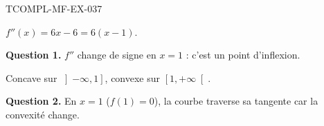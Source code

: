 \begin{corrige}{TCOMPL-MF-EX-037}

$f''(x) = 6x - 6 = 6(x-1)$.


\textbf{Question 1.} $f''$ change de signe en $x = 1$ : c'est un point d'inflexion.

Concave sur $\left]-\infty, 1\right]$, convexe sur $\left[1, +\infty\right[$.

\textbf{Question 2.} En $x = 1$ ($f(1) = 0$), la courbe traverse sa tangente car la convexité change.

\end{corrige}
